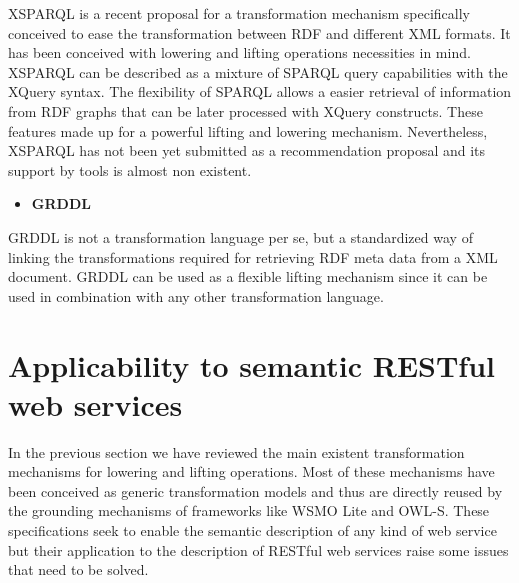 XSPARQL is a recent proposal for a transformation mechanism specifically conceived to ease the transformation between RDF and different XML formats. It has been conceived  with lowering and lifting operations necessities in mind. XSPARQL can be described as a mixture of SPARQL query capabilities with the XQuery syntax. The flexibility of SPARQL allows a easier retrieval of information from RDF graphs that can be later processed with XQuery constructs. These features made up for a powerful lifting and lowering mechanism. Nevertheless, XSPARQL has not been yet submitted as a recommendation proposal and its support by tools is almost non existent.

\begin{itemize}
\item \bf{GRDDL}
\end{itemize}

GRDDL is not a transformation language per se, but a standardized way of linking the transformations required for retrieving RDF meta data from a XML document. GRDDL can be used as a flexible lifting mechanism since it can be used in combination with any other transformation language.

\section{Applicability to semantic RESTful web services}

In the previous section we have reviewed the main existent transformation mechanisms for lowering and lifting operations. Most of these mechanisms have been conceived as generic transformation models and thus are directly reused by the grounding mechanisms of frameworks like WSMO Lite and OWL-S. These specifications seek to enable the semantic description of any kind of web service but their application to the description of RESTful web services raise some issues that need to be solved.\\

